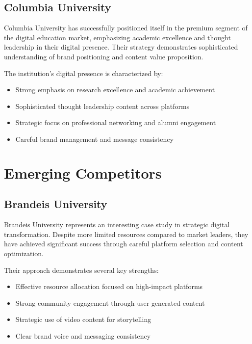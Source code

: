 \documentclass[12pt]{report}
\begin{document}
\subsection{Columbia University}

Columbia University has successfully positioned itself in the premium segment of the digital education market, emphasizing academic excellence and thought leadership in their digital presence. Their strategy demonstrates sophisticated understanding of brand positioning and content value proposition.

The institution's digital presence is characterized by:
\begin{itemize}
    \item Strong emphasis on research excellence and academic achievement
    \item Sophisticated thought leadership content across platforms
    \item Strategic focus on professional networking and alumni engagement
    \item Careful brand management and message consistency
\end{itemize}

\section{Emerging Competitors}

\subsection{Brandeis University}

Brandeis University represents an interesting case study in strategic digital transformation. Despite more limited resources compared to market leaders, they have achieved significant success through careful platform selection and content optimization.

Their approach demonstrates several key strengths:
\begin{itemize}
    \item Effective resource allocation focused on high-impact platforms
    \item Strong community engagement through user-generated content
    \item Strategic use of video content for storytelling
    \item Clear brand voice and messaging consistency
\end{itemize}
\end{document}
